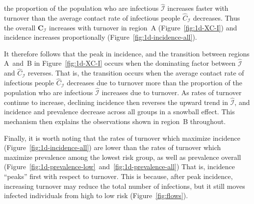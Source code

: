the proportion of the population who are infectious $\hat{\mathcal{I}}$
increases faster with turnover than
the average contact rate of infectious people $\hat{C}_{\mathcal{I}}$ decreases.
Thus the overall $\bm{C}_{\mathcal{I}}$ increases with turnover in region~A
(Figure~\ref{fig:1d-XC-I})
and incidence increases proportionally
(Figure~\ref{fig:1d-incidence-all}).
\par
It therefore follows that the peak in incidence, and
the transition between regions A~and~B in Figure~\ref{fig:1d-XC-I}
occurs when the dominating factor
between $\hat{\mathcal{I}}$ and $\hat{C}_{\mathcal{I}}$ reverses.
That is, the transition occurs when
the average contact rate of infectious people
$\hat{C}_{\mathcal{I}}$ decreases due to turnover
more than the proportion of the population who are infectious
$\hat{\mathcal{I}}$ increases due to turnover.
As rates of turnover continue to increase,
declining incidence then reverses the upward trend in $\hat{\mathcal{I}}$,
and incidence and prevalence decrease across all groups in a snowball effect.
This mechanism then explains the observations shown in region~B throughout.
\par
Finally, it is worth noting that
the rates of turnover which maximize incidence
(Figure~\ref{fig:1d-incidence-all}) are lower than
the rates of turnover which maximize prevalence
among the lowest risk group, as well as prevalence overall
(Figure~\ref{fig:1d-prevalence-low}~and~\ref{fig:1d-prevalence-all})
That is, incidence ``peaks'' first with respect to turnover.
This is because, after peak incidence,
increasing turnover may reduce the total number of infections,
but it still moves infected individuals from high to low risk
(Figure~\ref{fig:flows}).
